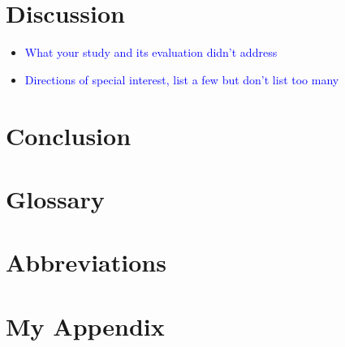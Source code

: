 \documentclass[11pt]{article}
\begin{document}
\section{Discussion}

\begin{itemize}
    \item \textcolor{blue}{What your study and its evaluation didn't address}
    \item \textcolor{blue}{Directions of special interest, list a few but don't list too many}
\end{itemize}


\section{Conclusion}
\section{Glossary}
\section{Abbreviations}

\appendix
\section{My Appendix}
\end{document}
